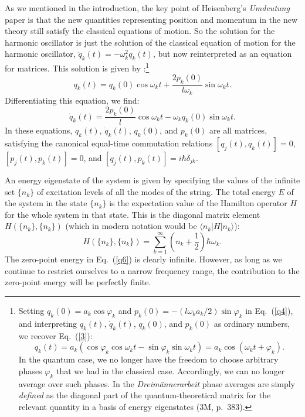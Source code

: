 \documentclass[12pt]{elsart}
\begin{document}
As we mentioned in the introduction, the key point of Heisenberg's {\it Umdeutung} paper is that the new quantities representing position and momentum in the new theory still satisfy the classical equations of motion. So the solution for the harmonic oscillator is just the solution of the classical equation of motion for the harmonic oscillator, $\ddot{q}_k(t) = - \omega_k^2 q_k(t)$, but now reinterpreted as an equation for matrices. This solution is given by \citep[p.\ 139, Eq.\ (530)]{Baym 1969}:\footnote{Setting $q_k(0) = a_k \cos{\varphi_k}$ and $p_k(0) = - (l \omega_k a_k/2) \sin{\varphi_k}$ in Eq.\ (\ref{q4}), and 
interpreting $q_k(t)$, $\dot{q}_k(t)$, $q_k(0)$, and $p_k(0)$ as ordinary numbers, we recover Eq.\ (\ref{3}):
$$
q_k(t)  = a_k \left( \cos{\varphi_k}  \cos{ \omega_k t}  -  \sin{\varphi_k} \sin{ \omega_k t}  \right) = a_k \cos{(\omega_k t + \varphi_k)}.
$$
In the quantum case, we no longer have the freedom to choose arbitrary phases $\varphi_k$ that we had in the classical case. Accordingly, we can no longer average over such phases. In the {\it Dreim\"annerarbeit} phase averages are simply {\it defined} as the diagonal part of the quantum-theoretical matrix for the relevant quantity in a basis of energy eigenstates (3M, p.\ 383).}
\begin{equation}
q_k(t)  =  q_k(0) \cos{ \omega_k t}  +  \frac{2p_k(0)}{l \omega_k}  \sin{ \omega_k t}.
\label{q4}
\end{equation}
Differentiating this equation, we find:
\begin{equation}
\dot{q}_k(t)  =  \frac{2p_k(0)}{l}  \cos{ \omega_k t}  -  \omega_k q_k(0) \sin{ \omega_k t}.
\label{q4a}
\end{equation}
In these equations, $q_k(t)$, $\dot{q}_k(t)$, $q_k(0)$, and $p_k(0)$ are all matrices, satisfying the canonical equal-time commutation relations $[q_j(t), q_k(t)] = 0$, $[p_j(t), p_k(t)] = 0$, and $[q_j(t), p_k(t)] = i \hbar \delta_{jk}$. 

An energy eigenstate of the system is given by specifying the values of the infinite set $\{n_k\}$ of excitation levels  of all the modes of the string. The total energy $E$ of the system in the state $\{n_k\}$ is the expectation value of the Hamilton operator $H$ for the whole system in that state. This is the diagonal matrix element $H(\{n_k\}, \{n_k\})$ (which in modern notation would be $\langle n_k | H | n_k \rangle$):
\begin{equation}
H(\{n_k\}, \{n_k\}) = \sum_{k=1}^\infty \left( n_k + \frac{1}{2} \right)  \hbar \omega_k.
\label{q6}
\end{equation}
The zero-point energy in Eq.\ (\ref{q6}) is clearly infinite. However, as long as we continue to restrict ourselves to a narrow frequency range, the contribution to the zero-point energy will be perfectly finite.
\end{document}
